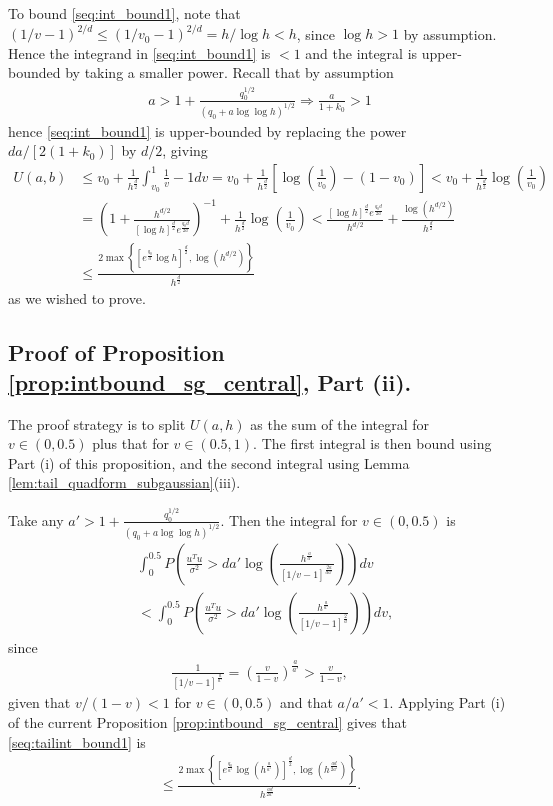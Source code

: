 To bound \eqref{seq:int_bound1}, note that $(1/v-1)^{2/d} \leq (1/v_0-1)^{2/d}= h/\log h < h$, since $\log h>1$ by assumption. Hence the integrand in \eqref{seq:int_bound1} is $<1$ and the integral is upper-bounded by taking a smaller power. 
Recall that by assumption
\begin{align}
a > 1 + \frac{q_0^{1/2}}{(q_0 + a \log\log h)^{1/2}} \Longrightarrow \frac{a}{1+k_0}>1
\nonumber
\end{align}
hence \eqref{seq:int_bound1} is upper-bounded by replacing the power $da/[2(1+k_0)]$ by $d/2$, giving
\begin{align}
U(a,b) &\leq v_0 + \frac{1}{h^{\frac{d}{2}}} \int_{v_0}^1 \frac{1}{v} -1 dv
=v_0 + \frac{1}{h^{\frac{d}{2}}} [\log(\frac{1}{v_0}) - (1-v_0)]
< v_0 + \frac{1}{h^{\frac{d}{2}}} \log(\frac{1}{v_0})
\nonumber \\
&= \left( 1 + \frac{h^{d/2}}{[\log h]^{\frac{d}{2}} e^{\frac{q_0d}{2a}}} \right)^{-1} + \frac{1}{h^{\frac{d}{2}}} \log(\frac{1}{v_0})
<  \frac{[\log h]^{\frac{d}{2}} e^{\frac{q_0d}{2a}}}{h^{d/2}} +
\frac{\log (h^{d/2})}{h^{\frac{d}{2}}}
\nonumber \\
& \leq \frac{2\max \left\{ [e^{\frac{q_0}{a}} \log h]^{\frac{d}{2}}, \log (h^{d/2}) \right\} }{h^{\frac{d}{2}}}
\nonumber
\end{align}
as we wished to prove.




\subsection{Proof of Proposition \ref{prop:intbound_sg_central}, Part (ii).}

The proof strategy is to split $U(a,h)$ as the sum of the integral for $v \in (0,0.5)$ plus that for $v \in (0.5,1)$. The first integral is then bound using Part (i) of this proposition, and the second integral using Lemma \ref{lem:tail_quadform_subgaussian}(iii).

Take any $a'>1 + \frac{q_0^{1/2}}{(q_0 + a \log\log h)^{1/2}}$. Then the integral for $v \in (0,0.5)$ is
\begin{align}
& \int_0^{0.5} P \left( \frac{u^Tu}{\sigma^2} > d a' \log \left( \frac{h^{\frac{a}{a'}}}{[1/v-1]^{\frac{2a}{d a'}}} \right) \right) dv
\nonumber \\
&< \int_0^{0.5} P \left( \frac{u^T u}{\sigma^2} > d a' \log \left( \frac{h^{\frac{a}{a'}}}{[1/v-1]^{\frac{2}{d}}} \right) \right) dv,
\label{seq:tailint_bound1}
\end{align}
since 
\begin{align}
 \frac{1}{[1/v-1]^{\frac{a}{a'}}}= \left( \frac{v}{1-v} \right)^{\frac{a}{a'}} > \frac{v}{1-v},
\nonumber
\end{align}
given that $v/(1-v) < 1$ for $v \in (0,0.5)$ and that $a/a'<1$. Applying Part (i) of the current Proposition \ref{prop:intbound_sg_central} gives that \eqref{seq:tailint_bound1} is
\begin{align}
\leq \frac{2\max \left\{ [e^{\frac{q_0}{a'}} \log (h^{\frac{a}{a'}})]^{\frac{d}{2}}, \log (h^{\frac{ad}{2a'}}) \right\} }{h^{\frac{ad}{2a'}}}.
\label{seq:tailint_bound2}
\end{align}


